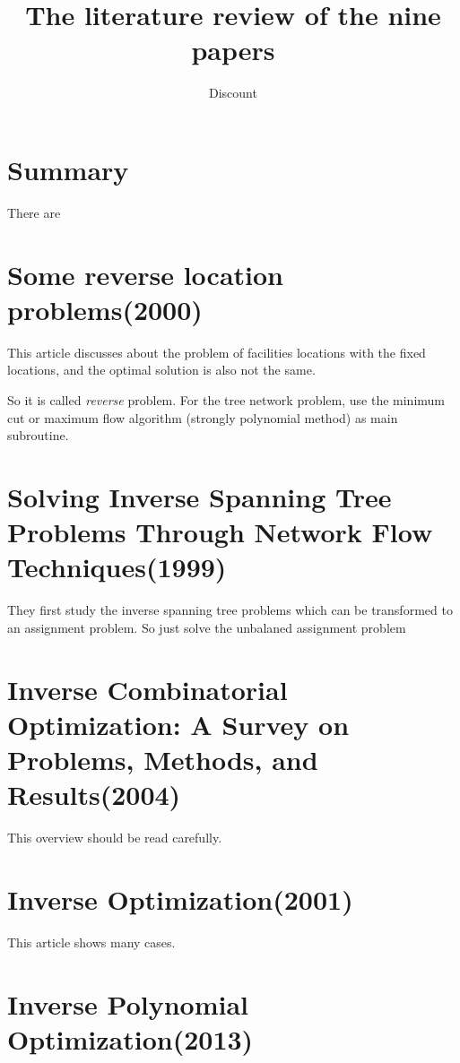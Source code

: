 \documentclass[UTF8]{article}
\title{The literature review of the nine papers}
\author{Dis\cdot count}
\begin{document}
\maketitle{}

\section{Summary}

There are

\section{Some reverse location problems(2000)}

This article discusses about the problem of facilities locations with the fixed locations, and the optimal solution is also not the same.

So it is called \emph{reverse} problem. For the tree network problem, use the minimum cut or maximum flow algorithm (strongly polynomial method) as main subroutine.


\section{Solving Inverse Spanning Tree Problems Through Network Flow Techniques(1999)}

They ﬁrst study the inverse spanning tree problems which can be transformed to an assignment problem. So just solve the unbalaned assignment problem


\section{Inverse Combinatorial Optimization: A Survey on Problems, Methods, and Results(2004)}

This overview should be read carefully.



\section{Inverse Optimization(2001)}

This article shows many cases.



\section{Inverse Polynomial Optimization(2013)}
\end{document}
